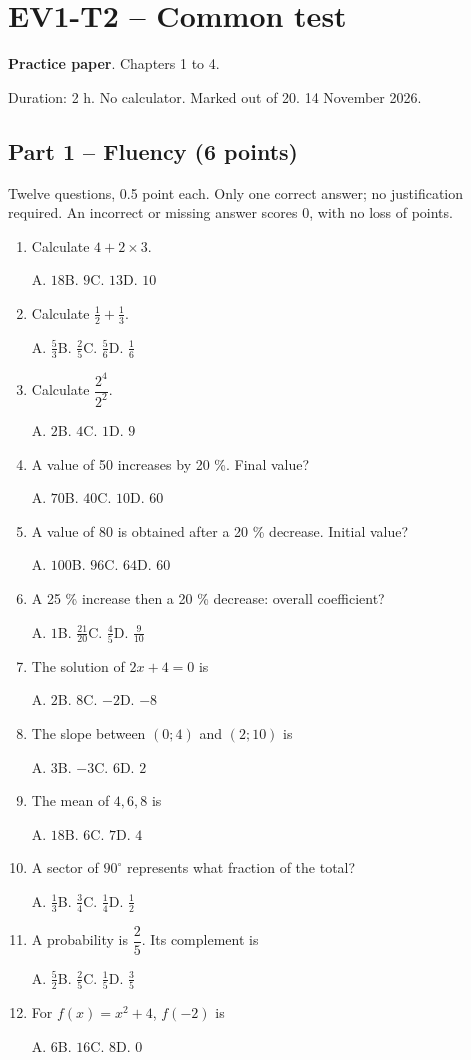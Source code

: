 \clearpage\section*{EV1-T2 -- Common test}\label{EV1-T2}
\textbf{Practice paper}. Chapters 1 to 4.\par Duration: 2 h. No calculator. Marked out of 20. 14 November 2026.
\subsection*{Part 1 -- Fluency (6 points)}
Twelve questions, 0.5 point each. Only one correct answer; no justification required. An incorrect or missing answer scores 0, with no loss of points.
\begin{enumerate}
\item Calculate $4+2\times3$.\par A. $18$\quad B. $9$\quad C. $13$\quad D. $10$
\item Calculate $\frac12+\frac13$.\par A. $\frac{5}{3}$\quad B. $\frac{2}{5}$\quad C. $\frac{5}{6}$\quad D. $\frac{1}{6}$
\item Calculate $\dfrac{2^4}{2^{2}}$.\par A. $2$\quad B. $4$\quad C. $1$\quad D. $9$
\item A value of 50 increases by 20 \%. Final value?\par A. $70$\quad B. $40$\quad C. $10$\quad D. $60$
\item A value of 80 is obtained after a 20 \% decrease. Initial value?\par A. $100$\quad B. $96$\quad C. $64$\quad D. $60$
\item A 25 \% increase then a 20 \% decrease: overall coefficient?\par A. $1$\quad B. $\frac{21}{20}$\quad C. $\frac{4}{5}$\quad D. $\frac{9}{10}$
\item The solution of $2x+4=0$ is\par A. $2$\quad B. $8$\quad C. $-2$\quad D. $-8$
\item The slope between $(0;4)$ and $(2;10)$ is\par A. $3$\quad B. $-3$\quad C. $6$\quad D. $2$
\item The mean of $4, 6, 8$ is\par A. $18$\quad B. $6$\quad C. $7$\quad D. $4$
\item A sector of $90^\circ$ represents what fraction of the total?\par A. $\frac{1}{3}$\quad B. $\frac{3}{4}$\quad C. $\frac{1}{4}$\quad D. $\frac{1}{2}$
\item A probability is $\dfrac{2}{5}$. Its complement is\par A. $\frac{5}{2}$\quad B. $\frac{2}{5}$\quad C. $\frac{1}{5}$\quad D. $\frac{3}{5}$
\item For $f(x)=x^2+4$, $f(-2)$ is\par A. $6$\quad B. $16$\quad C. $8$\quad D. $0$
\end{enumerate}
